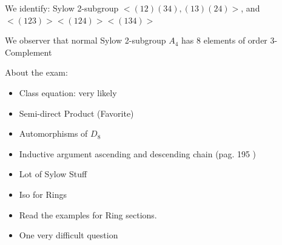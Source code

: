 \documentclass[notitlepage]{article}
\theoremstyle{definition}
\theoremstyle{remark}
\begin{document}
We identify: Sylow 2-subgroup $ < (12)(34),(13)(24) > $, and $ <(123)> <(124)> <(134)> $

We observer that normal Sylow 2-subgroup $ A_4 $ has $ 8 $ elements of order $ 3 $-Complement


About the exam:
\begin{itemize}
	\item Class equation: very likely
	\item Semi-direct Product (Favorite)
	\item Automorphisms of $ D_8 $
	\item Inductive argument ascending and descending chain (pag. 195 )
	\item Lot of Sylow Stuff
	\item Iso for Rings
	\item Read the examples for Ring sections.
	\item One very difficult question
	
\end{itemize}
\end{document}

